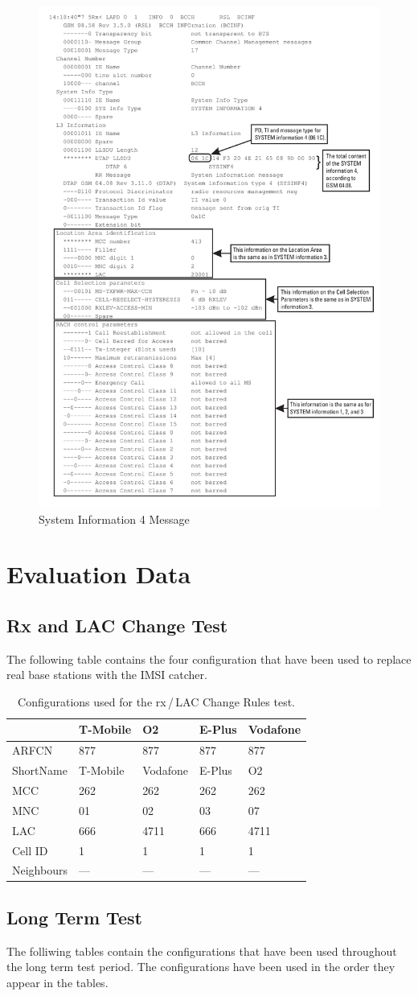 \begin{figure}
\centering
\includegraphics[width=.9\textwidth]{../Images/sysinfo4}
\caption{System Information 4 Message}
\end{figure}
\chapter{Evaluation Data}
\section{Rx and LAC Change Test}
\label{sec:lac_change_test}
The following table contains the four configuration that have been used to replace real base stations with the IMSI catcher.
\begin{table}[h!]
\centering
\begin{tabular}{lllll}
\toprule
			&T-Mobile		&O2				&E-Plus			&Vodafone\\
\midrule
ARFCN		&877			&877			&877			&877	\\
ShortName	&T-Mobile		&Vodafone		&E-Plus			&O2		\\
MCC			&262			&262			&262			&262	\\
MNC			&01				&02				&03				&07		\\
LAC			&666			&4711			&666			&4711	\\
Cell ID		&1				&1				&1				&1		\\
Neighbours	&---				&---				&---				&---		\\
\bottomrule
\end{tabular}
\caption{Configurations used for the rx\,/\,LAC Change Rules test.}
\end{table}
\section{Long Term Test}
\label{sec:long_term_test}
The folliwing tables contain the configurations that have been used throughout the long term test period.
The configurations have been used in the order they appear in the tables.